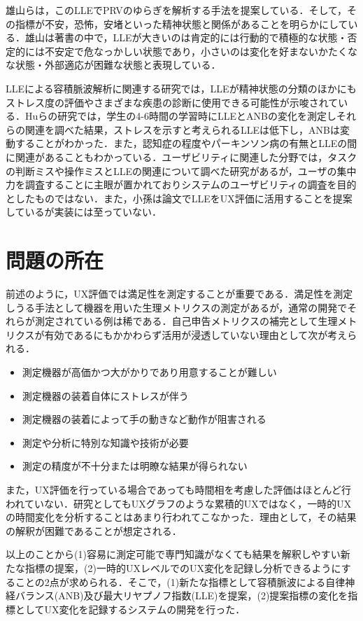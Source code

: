 雄山らは，このLLEでPRVのゆらぎを解析する手法を提案している\cite{oyama2006}．そして，その指標が不安，恐怖，安堵といった精神状態と関係があることを明らかにしている\cite{imanishi2007}．雄山は著書の中で，LLEが大きいのは肯定的には行動的で積極的な状態・否定的には不安定で危なっかしい状態であり，小さいのは変化を好まないかたくなな状態・外部適応が困難な状態と表現している\cite{oyama2012book}．

LLEによる容積脈波解析に関連する研究では，LLEが精神状態の分類のほかにもストレス度の評価やさまざまな疾患の診断に使用できる可能性が示唆されている．Huらの研究では，学生の4-6時間の学習時にLLEとANBの変化を測定しそれらの関連を調べた結果，ストレスを示すと考えられるLLEは低下し，ANBは変動することがわかった\cite{hu}．また，認知症の程度やパーキンソン病の有無とLLEの間に関連があることもわかっている\cite{oyama2006dimentia}\cite{oyama2018perkinson}．ユーザビリティに関連した分野では，タスクの判断ミスや操作ミスとLLEの関連について調べた研究\cite{imanishi2006}があるが，ユーザの集中力を調査することに主眼が置かれておりシステムのユーザビリティの調査を目的としたものではない．また，小孫は論文でLLEをUX評価に活用することを提案しているが実装には至っていない\cite{komago}．

\section{問題の所在}

前述のように，UX評価では満足性を測定することが重要である．満足性を測定しうる手法として機器を用いた生理メトリクスの測定があるが，通常の開発でそれらが測定されている例は稀である．自己申告メトリクスの補完として生理メトリクスが有効であるにもかかわらず活用が浸透していない理由として次が考えられる．

\begin{itemize}
  \item 測定機器が高価かつ大がかりであり用意することが難しい
  \item 測定機器の装着自体にストレスが伴う
  \item 測定機器の装着によって手の動きなど動作が阻害される
  \item 測定や分析に特別な知識や技術が必要
  \item 測定の精度が不十分または明瞭な結果が得られない
\end{itemize}

また，UX評価を行っている場合であっても時間相を考慮した評価はほとんど行われていない．研究としてもUXグラフ\cite{kurosu2015}のような累積的UXではなく，一時的UXの時間変化を分析することはあまり行われてこなかった．理由として，その結果の解釈が困難であることが想定される．

以上のことから(1)容易に測定可能で専門知識がなくても結果を解釈しやすい新たな指標の提案，(2)一時的UXレベルでのUX変化を記録し分析できるようにすることの2点が求められる．そこで，(1)新たな指標として容積脈波による自律神経バランス(ANB)及び最大リヤプノフ指数(LLE)を提案，(2)提案指標の変化を指標としてUX変化を記録するシステムの開発を行った．